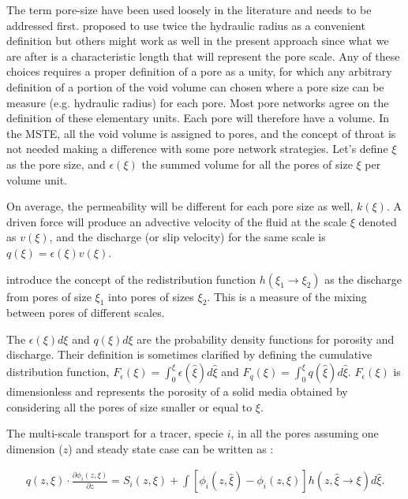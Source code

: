 \documentclass{CFD2011}
\begin{document}
The term pore-size have been used loosely in the literature and needs to be addressed first. \cite{Dullien} proposed to use twice the hydraulic radius as a convenient definition but others might work as well in the present approach since what we are after is a characteristic length that will represent the pore scale. Any of these choices requires a proper definition of a pore as a unity, for which any arbitrary definition of a portion of the void volume can chosen where a pore size can be measure (e.g. hydraulic radius) for each pore. Most pore networks agree on the definition of these elementary units. Each pore will therefore have a volume. In the MSTE, all the void volume is assigned to pores, and the concept of throat is not needed making a difference with some pore network strategies. Let's define $\xi$ as the pore size, and $\epsilon(\xi)$ the summed volume for all the pores of size $\xi$ per volume unit.

On average, the permeability will be different for each pore size as well, $k(\xi)$. A driven force will produce an advective velocity of the fluid at the scale $\xi$ denoted as $v(\xi)$, and the discharge (or slip velocity) for the same scale is $q(\xi)=\epsilon(\xi) v(\xi)$.

\cite{DupuySchwarz} introduce the concept of the redistribution function $h(\xi_1 \rightarrow \xi_2)$ as the discharge from pores of size $\xi_1$ into pores of sizes $\xi_2$. This is a measure of the mixing between pores of different scales.

The $\epsilon(\xi)d\xi$ and $q(\xi)d\xi$ are the probability density functions for porosity and discharge. Their definition is sometimes clarified by defining the cumulative distribution function, $F_{\epsilon}(\xi)=\int_0^{\xi}\epsilon(\hat \xi)d\hat\xi$ and $F_{q}(\xi)=\int_0^{\xi}q(\hat\xi)d\hat\xi$. $F_{\epsilon}(\xi)$ is dimensionless and represents the porosity of a solid media obtained by considering all the pores of size smaller or equal to $\xi$.

The multi-scale transport for a tracer, specie $i$, in all the pores assuming one dimension ($z$) and steady state case can be written as \citep{DupuySchwarz}:

\begin{align}
q(z, \xi) \cdot \frac{\partial \phi_{i}(z, \xi)}{\partial z}  = 
 S_{i}(z, \xi) + \int [\phi_{i}(z, \hat \xi) - \phi_{i}(z, \xi)] h(z, \hat \xi \rightarrow \xi) d\hat \xi . 
\label{eq:ss2}
\end{align}
\end{document}
